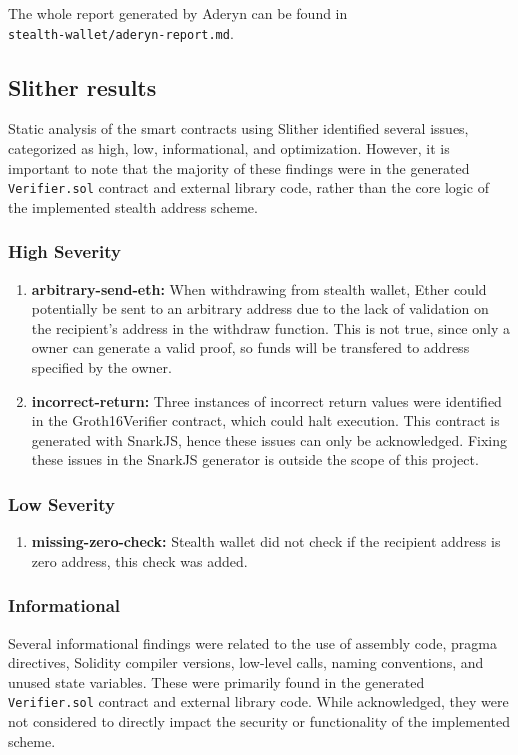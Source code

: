 The whole report generated by Aderyn can be found in\\\texttt{stealth-wallet/aderyn-report.md}.

\subsection{Slither results}

Static analysis of the smart contracts using Slither identified several
issues, categorized as high, low, informational, and optimization.
However, it is important to note that the majority of these findings were in the
generated \texttt{Verifier.sol} contract and external library code, rather
than the core logic of the implemented stealth address scheme.

\subsubsection*{High Severity}
\begin{enumerate}
    \item \textbf{arbitrary-send-eth:} When withdrawing from stealth wallet, Ether
        could potentially be sent to an arbitrary address due to the lack of
        validation on the recipient's address in the withdraw function. This is
        not true, since only a owner can generate a valid proof, so funds
        will be transfered to address specified by the owner.
    \item \textbf{incorrect-return:} Three instances of incorrect return
        values were identified in the Groth16Verifier contract, which could halt
        execution. This contract is generated with SnarkJS, hence these issues
        can only be acknowledged. Fixing these issues in the SnarkJS generator
        is outside the scope of this project.
\end{enumerate}

\subsubsection*{Low Severity}
\begin{enumerate}
    \item \textbf{missing-zero-check: } Stealth wallet did not check if the
        recipient address is zero address, this check was added.
\end{enumerate}

\subsubsection*{Informational}
Several informational findings were related to the use of assembly code,
pragma directives, Solidity compiler versions, low-level calls, naming
conventions, and unused state variables. These were primarily found in the
generated \texttt{Verifier.sol} contract and external library code. While acknowledged,
they were not considered to directly impact the security or functionality of
the implemented scheme.

